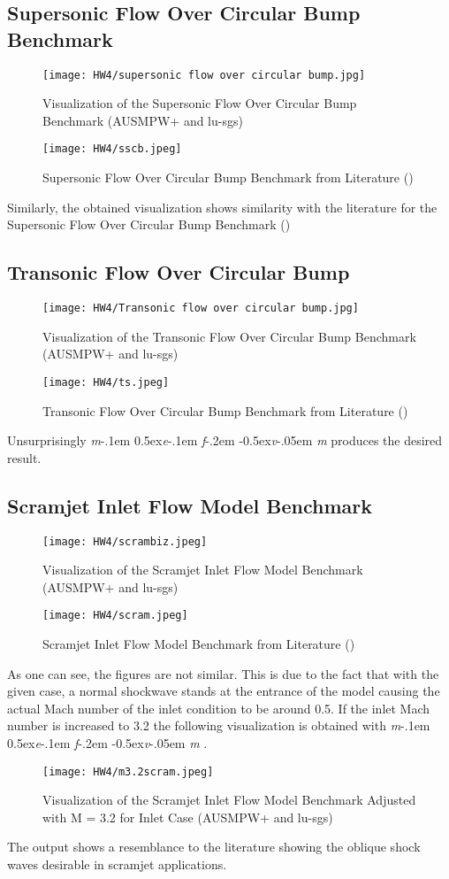 \documentclass[a4paper, 12pt]{article}
\newcommand\mefvm{%
    \textit{m}\kern-.1em%
    \raise0.5ex\hbox{\textit{e}}\kern-.1em%
    \textit{f}\kern-.2em%
    \raise-0.5ex\hbox{\textit{v}}\kern-.05em%
    \textit{m}
}
\begin{document}
\subsection{Supersonic Flow Over Circular Bump Benchmark}
\begin{figure}[H]
    \centering
    \texttt{[image: HW4/supersonic flow over circular bump.jpg]}
    \caption{Visualization of the Supersonic Flow Over Circular Bump Benchmark (AUSMPW+ and lu-sgs)}
\end{figure}
\begin{figure}[H]
    \centering
    \texttt{[image: HW4/sscb.jpeg]}
    \caption{Supersonic Flow Over Circular Bump Benchmark from Literature (\cite{mach14})}
\end{figure} \par
Similarly, the obtained visualization shows similarity with the literature for the Supersonic Flow Over Circular Bump Benchmark (\cite{mach14})
\newpage
\subsection{Transonic Flow Over Circular Bump}
\begin{figure}[H]
    \centering
    \texttt{[image: HW4/Transonic flow over circular bump.jpg]}
    \caption{Visualization of the Transonic Flow Over Circular Bump Benchmark (AUSMPW+ and lu-sgs)}
\end{figure}
\begin{figure}[H]
    \centering
    \texttt{[image: HW4/ts.jpeg]}
    \caption{Transonic Flow Over Circular Bump Benchmark from Literature (\cite{cs})}
\end{figure}
Unsurprisingly \mefvm produces the desired result.
\newpage
\subsection{Scramjet Inlet Flow Model Benchmark}
\begin{figure}[H]
    \centering
    \texttt{[image: HW4/scrambiz.jpeg]}
    \caption{Visualization of the Scramjet Inlet Flow Model Benchmark (AUSMPW+ and lu-sgs)}
\end{figure}
\begin{figure}[H]
    \centering
    \texttt{[image: HW4/scram.jpeg]}
    \caption{Scramjet Inlet Flow Model Benchmark from Literature (\cite{scram})}
\end{figure}
As one can see, the figures are not similar. This is due to the fact that with the given case, a normal shockwave stands at the entrance of the model causing the actual Mach number of the inlet condition to be around 0.5. If the inlet Mach number is increased to 3.2 the following visualization is obtained with \mefvm.
\begin{figure}[H]
    \centering
    \texttt{[image: HW4/m3.2scram.jpeg]}
    \caption{Visualization of the Scramjet Inlet Flow Model Benchmark Adjusted with M = 3.2 for Inlet Case (AUSMPW+ and lu-sgs)}
\end{figure}
The output shows a resemblance to the literature showing the oblique shock waves desirable in scramjet applications.
\newpage
\printbibliography
\end{document}
